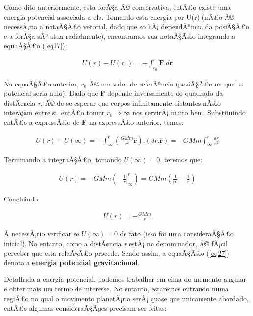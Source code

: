 Como dito anteriormente, esta forÃ§a Ã© conservativa, entÃ£o existe uma energia potencial associada a ela. Tomando esta energia por U(r) (nÃ£o Ã© necessÃ¡ria a notaÃ§Ã£o vetorial, dado que so hÃ¡ dependÃªncia da posiÃ§Ã£o e a forÃ§a sÃ³ atua radialmente), encontramos sua notaÃ§Ã£o integrando a equaÃ§Ã£o (\ref{eq17}):

\begin{eqnarray}
    U(r) - U(r_0) = -\int_{r_0}^{r}{\mathbf{F}.d\mathbf{r}}    \label{eq24}
\end{eqnarray}

Na equaÃ§Ã£o anterior, $r_0$ Ã© um valor de referÃªncia (posiÃ§Ã£o na qual o potencial seria nulo). Dado que \textbf{F} depende inversamente do quadrado da distÃ¢ncia \textit{r}, Ã© de se esperar que corpos infinitamente distantes nÃ£o interajam entre si, entÃ£o tomar $r_0 \Rightarrow \infty$ nos servirÃ¡ muito bem. Substituindo entÃ£o a expressÃ£o de \textbf{F} na expressÃ£o anterior, temos:

\begin{eqnarray}
    U(r) - U(\infty) = -\int_{\infty}^{r}{\left(\frac{GMm}{r^2}\mathbf{\hat{r}}\right).\left(dr.\mathbf{\hat{r}}\right)} =  -GMm\int_{\infty}^{r}{\frac{dr}{r^2}}    \label{eq25}
\end{eqnarray}

Terminando a integraÃ§Ã£o, tomando $U(\infty) = 0$, teremos que:

\begin{eqnarray}
    U(r) = -GMm\left(-\left.\frac{1}{r}\right|_{\infty}^r \right) = GMm \left( \frac{1}{\infty} - \frac{1}{r} \right)    \label{eq26}
\end{eqnarray}

Concluindo:

\begin{eqnarray}
    U(r) = -\frac{GMm}{r} \label{eq27}
\end{eqnarray}

Ã necessÃ¡rio verificar se $U(\infty) = 0$ de fato (isso foi uma consideraÃ§Ã£o inicial). No entanto, como a distÃ¢ncia \textit{r} estÃ¡ no denominador, Ã© fÃ¡cil perceber que esta relaÃ§Ã£o procede. Sendo assim, a equaÃ§Ã£o (\ref{eq27}) denota a \textbf{energia potencial gravitacional}.{\\}

Detalhada a energia potencial, podemos trabalhar em cima do momento angular e obter mais um termo de interesse. No entanto, estaremos entrando numa regiÃ£o no qual o movimento planetÃ¡rio serÃ¡ quase que unicamente abordado, entÃ£o algumas consideraÃ§Ãµes precisam ser feitas:

